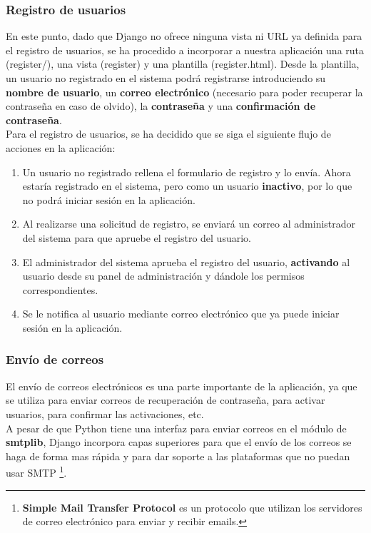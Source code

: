 \subsubsection{Registro de usuarios}
En este punto, dado que Django no ofrece ninguna vista ni URL ya definida para el registro
de usuarios, se ha procedido a incorporar a nuestra aplicación una ruta (register/),
una vista (register) y una plantilla (register.html). Desde la plantilla, un usuario no
registrado en el sistema podrá registrarse introduciendo su \textbf{nombre de usuario}, un
\textbf{correo electrónico} (necesario para poder recuperar la contraseña en caso de
olvido), la \textbf{contraseña} y una \textbf{confirmación de contraseña}.\\

Para el registro de usuarios, se ha decidido que se siga el siguiente flujo de acciones en
la aplicación:

    \begin{enumerate}
        \item Un usuario no registrado rellena el formulario de registro y lo envía. Ahora
        estaría registrado en el sistema, pero como un usuario \textbf{inactivo}, por lo
        que no podrá iniciar sesión en la aplicación.
        \item Al realizarse una solicitud de registro, se enviará un correo al administrador
        del sistema para que apruebe el registro del usuario.
        \item El administrador del sistema aprueba el registro del usuario, \textbf{activando}
        al usuario desde su panel de administración y dándole los permisos correspondientes.
        \item Se le notifica al usuario mediante correo electrónico que ya puede iniciar
        sesión en la aplicación.
    \end{enumerate}

\subsubsection{Envío de correos} \label{subsubsec:send-mails}
El envío de correos electrónicos es una parte importante de la aplicación, ya que se
utiliza para enviar correos de recuperación de contraseña, para activar usuarios, para
confirmar las activaciones, etc.\\

A pesar de que Python tiene una interfaz para enviar correos en el módulo de
\textbf{smtplib}, Django incorpora capas superiores para que el envío de los correos se
haga de forma mas rápida y para dar soporte a las plataformas que no puedan usar SMTP
\footnote{\textbf{Simple Mail Transfer Protocol} es un protocolo que utilizan los servidores
de correo electrónico para enviar y recibir emails.}.\\


